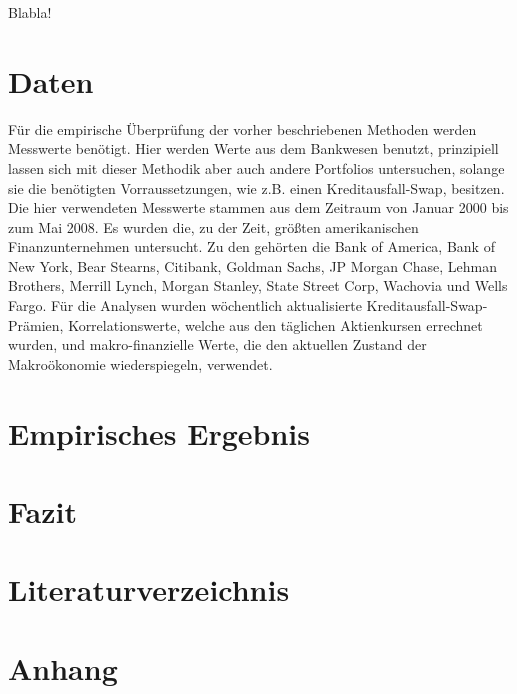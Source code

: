 \documentclass[a4paper,12pt]{scrartcl}
\begin{document}
Blabla!
\newpage
\section{Daten}
Für die empirische Überprüfung der vorher beschriebenen Methoden werden Messwerte benötigt. Hier werden Werte aus dem Bankwesen benutzt, prinzipiell lassen sich mit dieser Methodik aber auch andere Portfolios untersuchen, solange sie die benötigten Vorraussetzungen, wie z.B. einen Kreditausfall-Swap, besitzen. 
Die hier verwendeten Messwerte stammen aus dem Zeitraum von Januar 2000 bis zum Mai 2008. Es wurden die, zu der Zeit, größten amerikanischen Finanzunternehmen untersucht. Zu den gehörten die Bank of America, Bank of New York, Bear Stearns, Citibank, Goldman Sachs, JP Morgan Chase, Lehman Brothers, Merrill Lynch, Morgan Stanley, State Street Corp, Wachovia und Wells Fargo. 
Für die Analysen wurden wöchentlich aktualisierte Kreditausfall-Swap-Prämien, Korrelationswerte, welche aus den täglichen Aktienkursen errechnet wurden, und makro-finanzielle Werte, die den aktuellen Zustand der Makroökonomie wiederspiegeln,  verwendet.

\newpage
\section{Empirisches Ergebnis}
\newpage
\section{Fazit}
\newpage
\section{Literaturverzeichnis}
\newpage

\section{Anhang}
\end{document}

